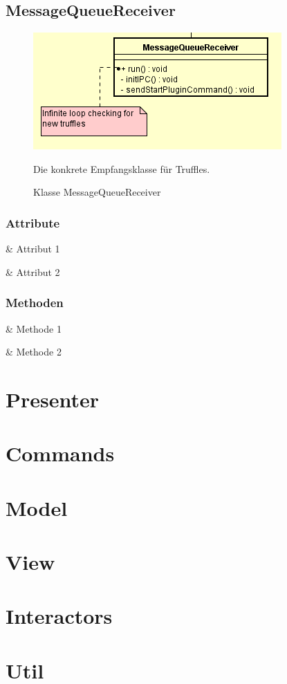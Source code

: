 \subsection{MessageQueueReceiver}

\begin{figure}[H]
    \centering
    \includegraphics[width=\textwidth]{../diagramimages/MessageQueueReceiver.png}
    \caption[Klasse MessageQueueRceceiver]{Klasse MessageQueueReceiver}
    \medskip
    Die konkrete Empfangsklasse für Truffles.
\end{figure}

\subsubsection*{Attribute}

\begin{easylist}[itemize]

    & Attribut 1

    & Attribut 2

\end{easylist}

\subsubsection*{Methoden}

\begin{easylist}[itemize]

    & Methode 1

    & Methode 2

\end{easylist}

\section{Presenter}

\section{Commands}

\section{Model}

\section{View}

\section{Interactors}

\section{Util}